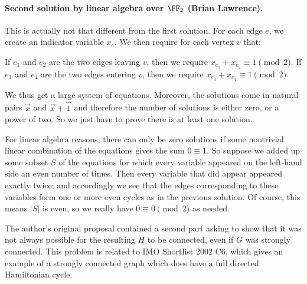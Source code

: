 \documentclass[11pt]{scrartcl}
\begin{document}
\paragraph{Second solution by linear algebra over $\FF_2$ (Brian Lawrence).}
This is actually not that different from the first solution.
For each edge $e$, we create an indicator variable $x_e$.
We then require for each vertex $v$ that:
\begin{itemize}
  \ii If $e_1$ and $e_2$ are the two edges leaving $v$,
  then we require $x_{e_1} + x_{e_2} \equiv 1 \pmod 2$.
  \ii If $e_3$ and $e_4$ are the two edges entering $v$,
  then we require $x_{e_3} + x_{e_4} \equiv 1 \pmod 2$.
\end{itemize}
We thus get a large system of equations.
Moreover, the solutions come in natural pairs $\vec x$ and $\vec x + \vec 1$
and therefore the number of solutions is either zero, or a power of two.
So we just have to prove there is at least one solution.

For linear algebra reasons, there can only be zero solutions
if some nontrivial linear combination of the equations gives the sum $0 \equiv 1$.
So suppose we added up some subset $S$ of the equations
for which every variable appeared on the left-hand side an even number of times.
Then every variable that did appear appeared exactly twice;
and accordingly we see that the edges corresponding to these variables
form one or more even cycles as in the previous solution.
Of course, this means $|S|$ is even, so we really have $0 \equiv 0 \pmod 2$ as needed.

\begin{remark*}
  The author's original proposal contained a second part
  asking to show that it was not always possible
  for the resulting $H$ to be connected,
  even if $G$ was strongly connected.
  This problem is related to IMO Shortlist 2002 C6,
  which gives an example of a strongly connected graph
  which does have a full directed Hamiltonian cycle.
\end{remark*}
\pagebreak
\end{document}
